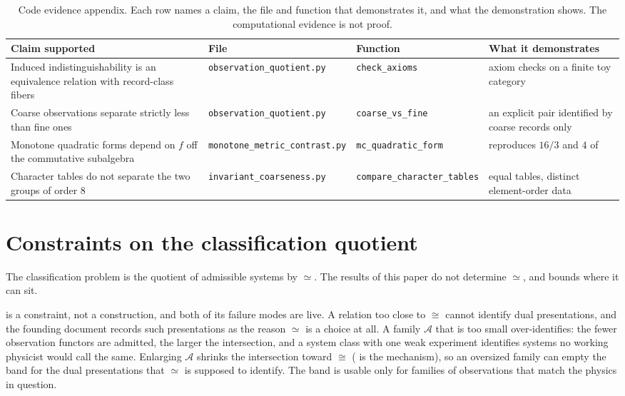 \documentclass[11pt,letterpaper]{article}
\theoremstyle{definition}
\theoremstyle{remark}
\begin{document}
\begin{table}[t]
\centering
\footnotesize
\begin{tabularx}{\textwidth}{@{} L{0.26\textwidth} L{0.21\textwidth} L{0.17\textwidth} X @{}}
\toprule
Claim supported & File & Function & What it demonstrates \\
\midrule
Induced indistinguishability is an equivalence relation with record-class fibers & \texttt{observation\_\allowbreak quotient.py} & \texttt{check\_\allowbreak axioms} & axiom checks on a finite toy category \\
Coarse observations separate strictly less than fine ones & \texttt{observation\_\allowbreak quotient.py} & \texttt{coarse\_\allowbreak vs\_\allowbreak fine} & an explicit pair identified by coarse records only \\
Monotone quadratic forms depend on $f$ off the commutative subalgebra & \texttt{monotone\_\allowbreak metric\_\allowbreak contrast.py} & \texttt{mc\_\allowbreak quadratic\_\allowbreak form} & reproduces $16/3$ and $4$ of  \\
Character tables do not separate the two groups of order 8 & \texttt{invariant\_\allowbreak coarseness.py} & \texttt{compare\_\allowbreak character\_\allowbreak tables} & equal tables, distinct element-order data \\
\bottomrule
\end{tabularx}
\caption{Code evidence appendix. Each row names a claim, the file and function that demonstrates it, and what the demonstration shows. The computational evidence is not proof.}
\label{tab:code}
\end{table}

\section{Constraints on the classification quotient}
\label{sec:constraints}

The classification problem is the quotient of admissible systems by $\simeq$. The results of this paper do not determine $\simeq$, and  bounds where it can sit.

 is a constraint, not a construction, and both of its failure modes are live. A relation too close to $\cong$ cannot identify dual presentations, and the founding document records such presentations as the reason $\simeq$ is a choice at all. A family $\mathcal{A}$ that is too small over-identifies: the fewer observation functors are admitted, the larger the intersection, and a system class with one weak experiment identifies systems no working physicist would call the same. Enlarging $\mathcal{A}$ shrinks the intersection toward $\cong$ ( is the mechanism), so an oversized family can empty the band for the dual presentations that $\simeq$ is supposed to identify. The band is usable only for families of observations that match the physics in question.
\end{document}
